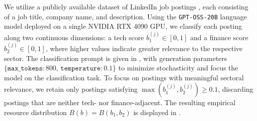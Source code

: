 \documentclass{article}
\begin{document}
            We utilize a publicly available dataset of LinkedIn job postings \cite{arsh_koneru_2024}, each consisting of a job title, company name, and description. Using the \texttt{GPT-OSS-20B} language model deployed on a single NVIDIA RTX 4090 GPU, we classify each posting along two continuous dimensions: a tech score $b_1^{(j)} \in [0,1]$ and a finance score $b_2^{(j)} \in [0,1]$, where higher values indicate greater relevance to the respective sector. The classification prompt is given in , with generation parameters $\{\texttt{max\_tokens}: 800,\, \texttt{temperature}: 0.1\}$ to minimize stochasticity and focus the model on the classification task. To focus on postings with meaningful sectoral relevance, we retain only postings satisfying $\max(b_1^{(j)}, b_2^{(j)}) \geq 0.1$, discarding postings that are neither tech- nor finance-adjacent. The resulting empirical resource distribution $B(b) = B(b_1, b_2)$ is displayed in .
\end{document}
